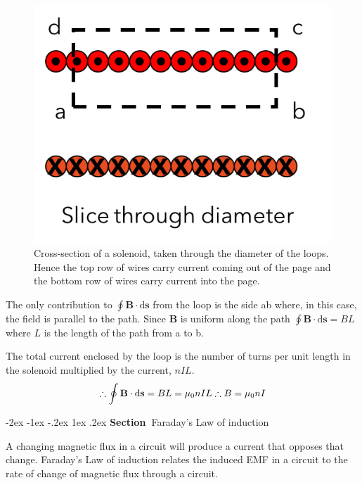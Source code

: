 \documentclass[
]{book}
\makeatletter
\renewcommand\section{%
\@startsection{section}{1}{\z@}%
              {-2ex \@plus -1ex \@minus -.2ex}%
              {1ex \@plus .2ex}%
              {\sffamily\bfseries\large\noindent Section~}}
\numberwithin{equation}{section}
\makeatother
\begin{document}
\begin{figure}

{\centering \includegraphics[width=0.7\linewidth]{Figures/amperianLoop} 

}

\caption{Cross-section of a solenoid, taken through the diameter of the loops. Hence the top row of wires carry current coming out of the page and the bottom row of wires carry current into the page.}\label{fig:amperianLoop}
\end{figure}

The only contribution to \(\oint \mathbf{B} \cdot \mathrm{d}\mathbf{s}\) from the loop is the side
ab where, in this case, the field is parallel to the path. Since \(\mathbf{B}\) is
uniform along the path \(\oint \mathbf{B} \cdot \mathrm{d}\mathbf{s} = BL\) where \(L\) is the
length of the path from a to b.

The total current enclosed by the loop is the number of turns per unit
length in the solenoid multiplied by the current, \(nIL\).
\begin{equation}
\label{eq:ointB3}
\therefore \oint \mathbf{B} \cdot \mathrm{d}\mathbf{s} = BL = \mu_0 nIL \\
\therefore B = \mu_0 nI
\end{equation}

\hypertarget{faradays-law-of-induction}{%
\section{Faraday's Law of induction}\label{faradays-law-of-induction}}

A changing magnetic flux in a circuit will produce a current that
opposes that change. Faraday's Law of induction relates the induced EMF
in a circuit to the rate of change of magnetic flux through a circuit.
\end{document}
